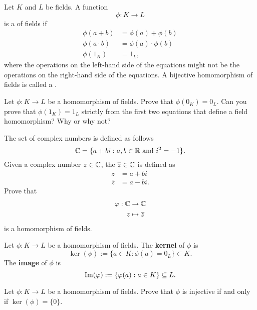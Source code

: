 \documentclass{ximera}
\begin{document}
\begin{definition}
  Let $K$ and $L$ be fields. A function
  \[
  \phi:K\to L
  \]
  is a  of fields if
  \begin{align*}
    \phi(a+b) &= \phi(a)+\phi(b)\\
    \phi(a\cdot b) &= \phi(a)\cdot \phi(b)\\
    \phi(1_K) &= 1_L,
  \end{align*}
  where the operations on the left-hand side of the equations might
  not be the operations on the right-hand side of the equations. A
  bijective homomorphism of fields is called a .
\end{definition}

\begin{exercise}
  Let $\phi:K\to L$ be a homomorphism of fields. Prove that $\phi(0_K)
  = 0_L$. Can you prove that $\phi(1_K) = 1_L$ strictly from the first
  two equations that define a field homomorphism? Why or why not?
\end{exercise}

\begin{exercise}\label{E:cc}
  The set of complex numbers is defined as follows
  \[
  \mathbb C = \{ a + b i: \text{$a,b\in\mathbb R$ and $i^2 = -1$}\}.
  \]
  Given a complex number $z\in\mathbb C$, the 
  $\overline{z}\in\mathbb C$ is defined as
  \begin{align*}
    z &= a+bi\\
    \bar{z} &= a- bi.
  \end{align*}
  Prove that
  \begin{align*}
    \varphi:\mathbb C &\to\mathbb C\\
    z &\mapsto \overline{z}
  \end{align*}
  is a homomorphism of fields.
\end{exercise}



\begin{definition}
  Let $\phi: K\to L$ be a homomorphism of fields. The \textbf{kernel}
  of $\phi$ is
  \[
  \ker(\phi) := \{a\in K:\phi(a) = 0_L\}\subset K.
  \]
  The \textbf{image} of $\phi$ is
  \[
  \operatorname{Im}(\varphi) := \{\varphi(a):a\in K\}\subseteq L.
  \]
\end{definition}


\begin{exercise}
  Let $\phi:K\to L$ be a homomorphism of fields. Prove that $\phi$ is
  injective if and only if $\ker(\phi) = \{0\}$.
\end{exercise}
\end{document}
